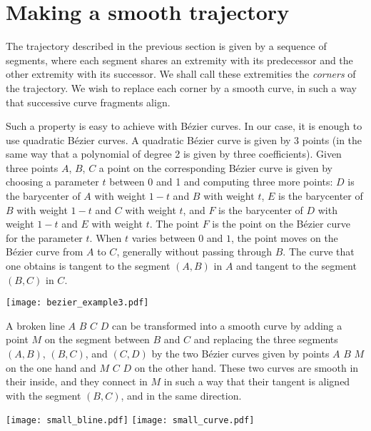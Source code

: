 \documentclass{easychair}
\begin{document}
\section{Making a smooth trajectory}
The trajectory described in the previous section is given by a
sequence of segments, where each segment shares an extremity with its
predecessor and the other extremity with its successor.  We shall call
these extremities the {\em corners} of the trajectory.  We wish to
replace each corner by a smooth curve, in such a way that successive
curve fragments align.

Such a property is easy to achieve with Bézier curves.  In our case,
it is enough to use quadratic Bézier curves.  A quadratic Bézier curve
is given by 3 points (in the same way that a polynomial of degree 2 is
given by three coefficients).  Given three points \(A\), \(B\), \(C\)
a point on the corresponding Bézier curve is given by choosing a
parameter \(t\) between 0 and 1 and computing three more points:
\(D\) is the barycenter of \(A\) with weight \(1 - t\) and \(B\) with
weight \(t\), \(E\) is the barycenter of \(B\) with weight \(1 - t\)
and \(C\) with weight \(t\), and \(F\) is the barycenter of \(D\) with
weight \(1-t\) and \(E\) with weight \(t\).  The point \(F\) is the
point on the Bézier curve for the parameter \(t\).  When \(t\) varies
between \(0\) and \(1\), the point moves on the Bézier curve from \(A\)
to \(C\), generally without passing through \(B\).  The curve that one
obtains is tangent to the segment \((A,B)\) in \(A\) and tangent to
the segment \((B,C)\) in \(C\).

\begin{center}
\texttt{[image: bezier\_example3.pdf]}
\end{center}


A broken line \(A\) \(B\) \(C\) \(D\) can be transformed into a smooth
curve by adding a point \(M\) on the segment between \(B\) and \(C\)
and replacing the three segments \((A, B)\), \((B, C)\), and \((C,
D)\) by the two Bézier curves given by points \(A\) \(B\) \(M\) on the
one hand and \(M\) \(C\) \(D\) on the other hand.  These two curves
are smooth in their inside, and they connect in \(M\) in such a way
that their tangent is aligned with the segment \((B, C)\), and in the
same direction.
\begin{center}
\texttt{[image: small\_bline.pdf]}
\texttt{[image: small\_curve.pdf]}
\end{center}
\end{document}
